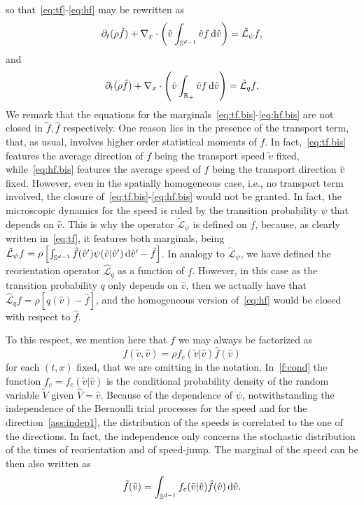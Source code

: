 \documentclass[a4paper]{article}
\theoremstyle{Theorem}\newtheorem{proposition}{Proposition}[section]
\theoremstyle{Remark}\newtheorem{remark}{Remark}[section]
\theoremstyle{Theorem}\newtheorem{theorem}{Theorem}[section]
\newcommand{\R}{\mathbb{R}}
\newcommand{\hv}{\hat{v}}
\newcommand{\tv}{\tilde{v}}
\newcommand{\hf}{\hat{f}}
\newcommand{\tf}{\tilde{f}}
\newcommand{\barf}{\rho}%
\newcommand{\hV}{\hat{V}}
\newcommand{\tV}{\tilde{V}}
\newcommand{\intS}{\int_{\mathbb{S}^{d-1}}}
\newcommand{\intR}{\int_{\R_+}}
\begin{document}
so that~\eqref{eq:tf}-\eqref{eq:hf} may be rewritten as
\begin{equation}\label{eq:tf.bis}
    \partial_t (\barf \tf) +\nabla_x \cdot \left( \tv \intS \hv f \, {\rm d} \hv\right) = \tilde{\mathcal{L}}_\psi f,
\end{equation}
and 
\begin{equation}\label{eq:hf.bis}
 \partial_t (\barf \hf) +\nabla_x \cdot \left( \hv \intR \tv f \, {\rm d} \tv\right) = \hat{\mathcal{L}}_qf.   
\end{equation}
We remark that the equations for the marginals~\eqref{eq:tf.bis}-\eqref{eq:hf.bis} are not closed in $\tf,\hf$ respectively. One reason lies in the presence of the transport term, that, as usual, involves higher order statistical moments of $f$. In fact,~\eqref{eq:tf.bis} features the average direction of $f$ being the transport speed $\tv$ fixed, while~\eqref{eq:hf.bis} features the average speed of $f$ being the transport direction $\hv$ fixed. However, even in the spatially homogeneous case, i.e., no transport term involved, the closure of~\eqref{eq:tf.bis}-\eqref{eq:hf.bis} would not be granted. In fact, the microscopic dynamics for the speed is ruled by the transition probability $\psi$ that depends on $\hv$. This is why the operator $\tilde{\mathcal{L}}_{\psi}$ is defined on $f$, because, as clearly written in~\eqref{eq:tf}, it features both marginals, being $\tilde{\mathcal{L}}_{\psi}f=\barf\left[ \intS \hf(\hv') \psi(\tv|\hv') \, {\rm d} \hv'-\tf \right]$. In analogy to $\tilde{\mathcal{L}}_{\psi}$, we have  defined the reorientation operator $\hat{\mathcal{L}}_q$ as a function of $f$. However, in this case as the transition probability $q$ only depends on $\hv$, then we actually have that $\hat{\mathcal{L}}_qf=\barf\left[ q(\hv)-\hf \right]$, and the homogeneous version of~\eqref{eq:hf} would be closed with respect to $\hf$. 

To this respect, we mention here that $f$ we may always be factorized as
\begin{equation}\label{f:cond}
    f(\tv,\hv)=\rho f_c(\tv|\hv) \hf(\hv)
\end{equation}
for each $(t,x)$ fixed, that we are omitting in the notation. In~\eqref{f:cond} the function $f_c=f_c(\tv|\hv)$ is the conditional probability density of the random variable $\tV$ given $\hV=\hv$. Because of the dependence of $\psi$, notwithstanding the independence of the Bernoulli trial processes for the speed and for the direction~\eqref{ass:indep1}, the distribution of the speeds is correlated to the one of the directions. In fact, the independence only concerns the stochastic distribution of the times of reorientation and of speed-jump. The marginal of the speed can be then also written as
\begin{equation}\label{ftilde_c}
    \tf(\tv) = \intS f_c(\tv|\hv) \hf(\hv) \, {\rm d} \hv.
\end{equation}
\end{document}
